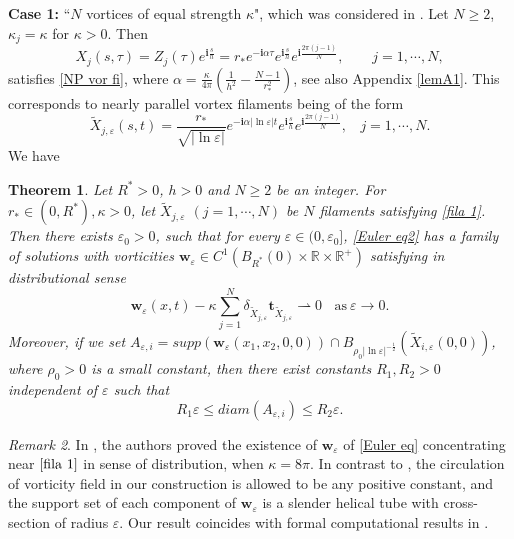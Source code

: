 \documentclass[12pt,reqno]{amsart}
\numberwithin{equation}{section}
\newtheorem{theorem}{Theorem}[section]
\theoremstyle{definition}
\theoremstyle{remark}
\newtheorem{remark}[theorem]{Remark}
\begin{document}
\textbf{Case 1:} ``$ N $  vortices of equal strength $ \kappa $", which was considered in \cite{GM2}. Let $ N\geq 2 $, $ \kappa_j=\kappa $ for   $ \kappa>0 $. Then 
\begin{equation*}
X_{j}(s,\tau)=Z_j(\tau)e^{\mathbf{i}\frac{s}{h}}=r_*e^{-\mathbf{i}\alpha\tau}e^{\mathbf{i}\frac{s}{h}}e^{\mathbf{i}\frac{2\pi (j-1)}{N}},\ \ \ \ \ \ \ \ \  j=1,\cdots,N, 
\end{equation*}
satisfies \eqref{NP vor fi}, where $ \alpha=\frac{\kappa}{4\pi}\left( \frac{1}{h^2}-\frac{N-1}{r_*^2}\right)  $, see also    Appendix \ref{lemA1}. This corresponds to   nearly parallel vortex filaments being of the form
\begin{equation}\label{fila 1}
\tilde{X}_{j,\varepsilon}(s, t)=\frac{r_*}{\sqrt{|\ln\varepsilon|}}e^{-\mathbf{i}\alpha|\ln\varepsilon|t}e^{\mathbf{i}\frac{s}{h}}e^{\mathbf{i}\frac{2\pi (j-1)}{N}},\ \ \ \ j=1,\cdots,N.
\end{equation}
We have 
\begin{theorem}\label{thm01}
	Let $ R^*>0 $, $ h>0 $ and $ N\geq 2 $ be an integer. For $ r_*\in (0,R^*) , \kappa>0 $, let $ \tilde{X}_{j,\varepsilon}$   $(j=1,\cdots,N)$ be $ N $ filaments satisfying \eqref{fila 1}. Then  there exists $ \varepsilon_0>0 $, such that for every $ \varepsilon\in(0,\varepsilon_0] $, \eqref{Euler eq2} has a  family of solutions with vorticities  $ \mathbf{w}_\varepsilon\in C^1(B_{R^*}(0)\times \mathbb{R}\times\mathbb{R}^+) $ satisfying in distributional sense
	\begin{equation*} 
	\mathbf{w}_\varepsilon(x,t)- \kappa\sum_{j=1}^N\delta_{\tilde{X}_{j,\varepsilon}}\textbf{t}_{\tilde{X}_{j,\varepsilon}}\rightharpoonup0\ \ \ \ \text{as}\ \varepsilon\to0.
	\end{equation*}
	Moreover, if we set $ A_{\varepsilon,i}=supp\left (\mathbf{w}_\varepsilon(x_1,x_2,0,0)\right ) \cap B_{\rho_0|\ln\varepsilon|^{-\frac{1}{2}}}\left ( \tilde{X}_{i,\varepsilon}(0,0)\right )  $, where $ \rho_0>0 $ is a small constant, then there exist constants $ R_1,R_2>0 $ independent of $ \varepsilon $  such that
	\begin{equation*}
	R_1\varepsilon \leq diam(A_{\varepsilon,i})\leq R_2\varepsilon .
	\end{equation*}
\end{theorem}

\begin{remark}
In \cite{GM2}, the authors proved the existence of $ \textbf{w}_\varepsilon $ of \eqref{Euler eq} concentrating near $ \eqref{fila 1} $ in sense of distribution, when $ \kappa=8\pi $. In contrast to \cite{GM2}, the circulation of vorticity field in our construction is allowed to be any positive constant, and the support set of each component of $ \textbf{w}_\varepsilon $ is a slender helical tube with cross-section of radius $ \varepsilon $. Our result coincides with formal computational results in \cite{KMD}.
\end{remark}
\end{document}
